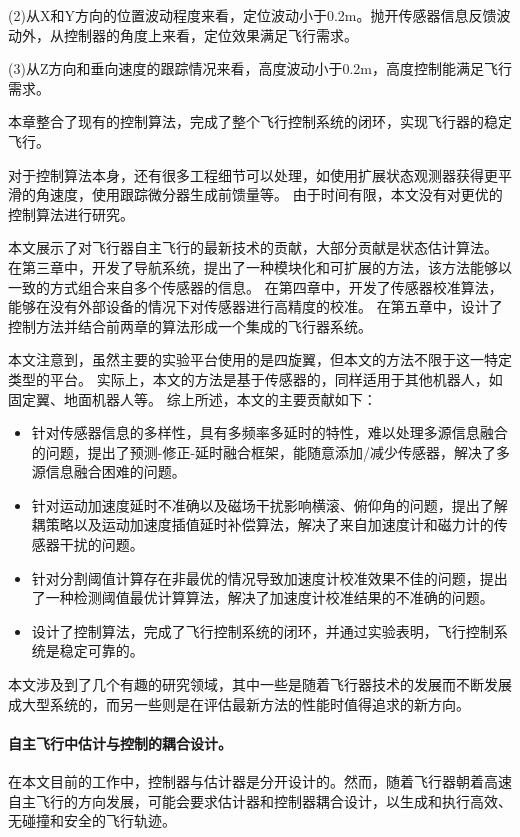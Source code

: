 \documentclass[
  type=master
]{gdutthesis}
\begin{document}
(2)从X和Y方向的位置波动程度来看，定位波动小于0.2m。抛开传感器信息反馈波动外，从控制器的角度上来看，定位效果满足飞行需求。

(3)从Z方向和垂向速度的跟踪情况来看，高度波动小于0.2m，高度控制能满足飞行需求。

本章整合了现有的控制算法，完成了整个飞行控制系统的闭环，实现飞行器的稳定飞行。

对于控制算法本身，还有很多工程细节可以处理，如使用扩展状态观测器获得更平滑的角速度，使用跟踪微分器生成前馈量等。
由于时间有限，本文没有对更优的控制算法进行研究。

\gdutbackmatter
{}
本文展示了对飞行器自主飞行的最新技术的贡献，大部分贡献是状态估计算法。
在第三章中，开发了导航系统，提出了一种模块化和可扩展的方法，该方法能够以一致的方式组合来自多个传感器的信息。
在第四章中，开发了传感器校准算法，能够在没有外部设备的情况下对传感器进行高精度的校准。
在第五章中，设计了控制方法并结合前两章的算法形成一个集成的飞行器系统。

本文注意到，虽然主要的实验平台使用的是四旋翼，但本文的方法不限于这一特定类型的平台。
实际上，本文的方法是基于传感器的，同样适用于其他机器人，如固定翼、地面机器人等。
综上所述，本文的主要贡献如下：
\begin{itemize}
	\item 针对传感器信息的多样性，具有多频率多延时的特性，难以处理多源信息融合的问题，提出了预测-修正-延时融合框架，能随意添加/减少传感器，解决了多源信息融合困难的问题。
	\item 针对运动加速度延时不准确以及磁场干扰影响横滚、俯仰角的问题，提出了解耦策略以及运动加速度插值延时补偿算法，解决了来自加速度计和磁力计的传感器干扰的问题。
	\item 针对分割阈值计算存在非最优的情况导致加速度计校准效果不佳的问题，提出了一种检测阈值最优计算算法，解决了加速度计校准结果的不准确的问题。
	\item 设计了控制算法，完成了飞行控制系统的闭环，并通过实验表明，飞行控制系统是稳定可靠的。
\end{itemize}

本文涉及到了几个有趣的研究领域，其中一些是随着飞行器技术的发展而不断发展成大型系统的，而另一些则是在评估最新方法的性能时值得追求的新方向。
\paragraph{自主飞行中估计与控制的耦合设计。}
在本文目前的工作中，控制器与估计器是分开设计的。然而，随着飞行器朝着高速自主飞行的方向发展，可能会要求估计器和控制器耦合设计，以生成和执行高效、无碰撞和安全的飞行轨迹。
\end{document}

